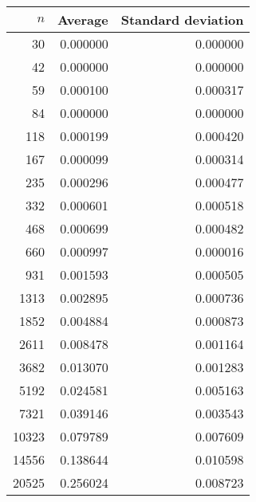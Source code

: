 \begin {tabular}{rrr}
$n$ & Average & Standard deviation\\ \hline 
30 & 0.000000 & 0.000000\\ 
42 & 0.000000 & 0.000000\\ 
59 & 0.000100 & 0.000317\\ 
84 & 0.000000 & 0.000000\\ 
118 & 0.000199 & 0.000420\\ 
167 & 0.000099 & 0.000314\\ 
235 & 0.000296 & 0.000477\\ 
332 & 0.000601 & 0.000518\\ 
468 & 0.000699 & 0.000482\\ 
660 & 0.000997 & 0.000016\\ 
931 & 0.001593 & 0.000505\\ 
1313 & 0.002895 & 0.000736\\ 
1852 & 0.004884 & 0.000873\\ 
2611 & 0.008478 & 0.001164\\ 
3682 & 0.013070 & 0.001283\\ 
5192 & 0.024581 & 0.005163\\ 
7321 & 0.039146 & 0.003543\\ 
10323 & 0.079789 & 0.007609\\ 
14556 & 0.138644 & 0.010598\\ 
20525 & 0.256024 & 0.008723\\ 
\end{tabular}
